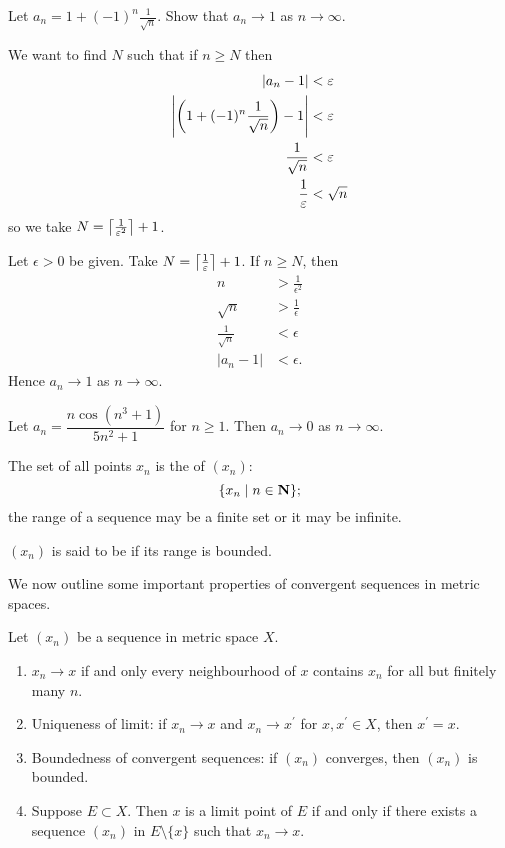 \begin{exercise}
Let $a_n=1+(-1)^n\frac{1}{\sqrt{n}}$. Show that $a_n\to 1$ as $n\to\infty$.
\end{exercise}

We want to find $N$ such that if $n\ge N$ then
\begin{align*}
|a_n-1|&<\varepsilon\\
\left|\left(1+(-1)^n\frac{1}{\sqrt{n}}\right)-1\right|&<\varepsilon\\
\frac{1}{\sqrt{n}}&<\varepsilon\\
\frac{1}{\varepsilon}&<\sqrt{n}
\end{align*}
so we take $N=\left\lceil \frac{1}{\varepsilon^2} \right\rceil+1$.

\begin{solution}
Let $\epsilon>0$ be given. Take $N=\left\lceil \frac{1}{\varepsilon} \right\rceil+1$. If $n\ge N$, then
\begin{align*}
n&>\frac{1}{\epsilon^2}\\
\sqrt{n}&>\frac{1}{\epsilon}\\
\frac{1}{\sqrt{n}}&<\epsilon\\
|a_n-1|&<\epsilon.
\end{align*}
Hence $a_n\to1$ as $n\to\infty$.
\end{solution}

\begin{exercise}
Let $a_n=\dfrac{n\cos(n^3+1)}{5n^2+1}$ for $n\ge1$. Then $a_n\to0$ as $n\to\infty$.
\end{exercise}



\begin{definition}
The set of all points $x_n$ is the  of $(x_n)$:
\[\{x_n\mid n\in\mathbf N\};\]
the range of a sequence may be a finite set or it may be infinite.

$(x_n)$ is said to be  if its range is bounded.
\end{definition}

We now outline some important properties of convergent sequences in metric spaces.

\begin{proposition}
Let $(x_n)$ be a sequence in metric space $X$.
\begin{enumerate}[label=(\roman*)]
\item $x_n\to x$ if and only every neighbourhood of $x$ contains $x_n$ for all but finitely many $n$.
\item Uniqueness of limit: if $x_n\to x$ and $x_n\to x^\prime$ for $x,x^\prime\in X$, then $x^\prime=x$.
\item Boundedness of convergent sequences: if $(x_n)$ converges, then $(x_n)$ is bounded.
\item Suppose $E\subset X$. Then $x$ is a limit point of $E$ if and only if there exists a sequence $(x_n)$ in $E\setminus\{x\}$ such that $x_n\to x$.
\end{enumerate}
\end{proposition}

